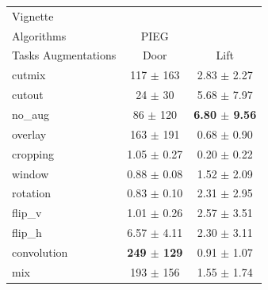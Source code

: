 \begin{tabular}{lcc}
Vignette & & \\
Algorithms & PIEG & \\
Tasks Augmentations & Door & Lift \\
cutmix          & 117 $\pm$ 163 & 2.83 $\pm$ 2.27 \\
cutout          & 24 $\pm$ 30 & 5.68 $\pm$ 7.97 \\
no\_aug         & 86 $\pm$ 120 & \textbf{6.80 $\pm$ 9.56} \\
overlay         & 163 $\pm$ 191 & 0.68 $\pm$ 0.90 \\
cropping        & 1.05 $\pm$ 0.27 & 0.20 $\pm$ 0.22 \\
window          & 0.88 $\pm$ 0.08 & 1.52 $\pm$ 2.09 \\
rotation        & 0.83 $\pm$ 0.10 & 2.31 $\pm$ 2.95 \\
flip\_v         & 1.01 $\pm$ 0.26 & 2.57 $\pm$ 3.51 \\
flip\_h         & 6.57 $\pm$ 4.11 & 2.30 $\pm$ 3.11 \\
convolution     & \textbf{249 $\pm$ 129} & 0.91 $\pm$ 1.07 \\
mix             & 193 $\pm$ 156 & 1.55 $\pm$ 1.74 \\
\end{tabular}